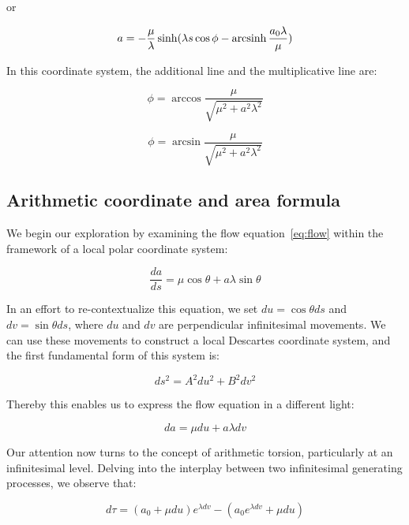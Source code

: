 or

\begin{equation}
    a = - \frac{\mu}{\lambda} \sinh(\lambda s \cos \phi - \operatorname{arcsinh} \frac{a_0 \lambda}{\mu})\label{eq:gradevo3}
\end{equation}

In this coordinate system, the additional line and the multiplicative line are:

\begin{equation}
    \phi = \arccos \frac{\mu}{\sqrt {\mu^2 + a^2 \lambda^2}} \label{eq:additionalline}
\end{equation}

\begin{equation}
    \phi = \arcsin \frac{\mu}{\sqrt {\mu^2 + a^2 \lambda^2}}\label {eq:mulitiplcativeline}
\end{equation}

\subsection{Arithmetic coordinate and area formula}\label{subsec:descartes-coordinate}
We begin our exploration by examining the flow equation~\eqref{eq:flow} within the framework of a local polar coordinate system:

\begin{equation}
    \frac{da}{ds} = \mu \cos \theta + a \lambda \sin \theta
\end{equation}

In an effort to re-contextualize this equation, we set $du = \cos \theta ds$ and $dv = \sin \theta ds$,
where $du$ and $dv$ are perpendicular infinitesimal movements.
We can use these movements to construct a local Descartes coordinate system, and the first fundamental form of this system is:

\begin{equation}
    ds^2 = A^2 du^2 + B^2 dv^2
\end{equation}

Thereby this enables us to express the flow equation in a different light:

\begin{equation}
    da = \mu du + a \lambda dv
\end{equation}

Our attention now turns to the concept of arithmetic torsion, particularly at an infinitesimal level.
Delving into the interplay between two infinitesimal generating processes, we observe that:

\begin{equation}
    d\tau = (a_0 + \mu du) e^{\lambda dv} - (a_0 e^{\lambda dv} + \mu du)
\end{equation}

